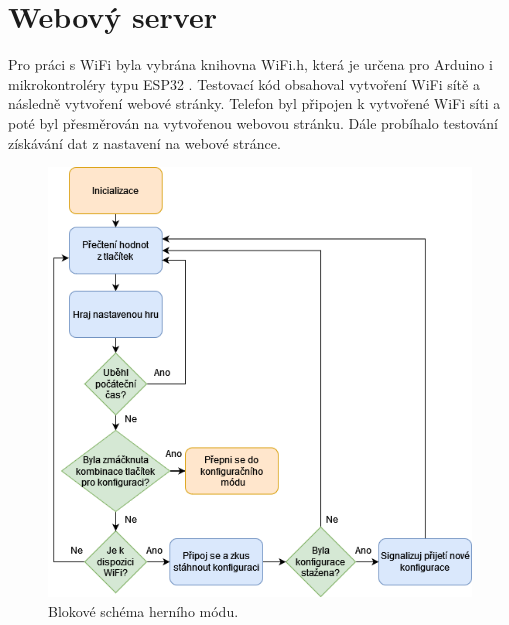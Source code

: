 \section{Webový server}

Pro práci s WiFi byla vybrána knihovna WiFi.h, která je určena pro Arduino i mikrokontroléry typu ESP32 \cite{WiFi_lib}. Testovací kód obsahoval vytvoření WiFi sítě a následně vytvoření webové 
stránky. Telefon byl připojen k vytvořené WiFi síti a poté byl přesměrován na vytvořenou webovou stránku. Dále probíhalo testování získávání dat z nastavení na webové stránce. 


\begin{figure}[!h]
  \begin{center}
    \includegraphics[scale=0.75]{obrazky/blokove_schema_modu_PLAY.png}
  \end{center}
  \caption[Blokové schéma herního módu]{Blokové schéma herního módu.}
\end{figure}

